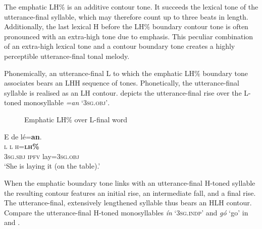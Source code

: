 The emphatic LH\% is an additive contour tone. It succeeds the  lexical tone of the utterance-final syllable, which may therefore count up to three beats in length. Additionally, the last lexical H before the LH\% boundary contour tone is often pronounced with an extra-high tone due to emphasis. This peculiar combination of an extra-high lexical tone and a contour boundary tone creates a highly perceptible utterance-final tonal melody. 



Phonemically, an utterance-final L to which the emphatic LH\% boundary tone associates bears an LHH sequence of tones. Phonetically, the utterance-final syllable is realised as an LH contour.  depicts the utterance-final rise over the L-toned monosyllable \textit{=an} ‘\textsc{3sg.obj’}. 


\begin{figure}
\caption{Emphatic LH\% over L-final word}
\label{fig:key:3.30}
\end{figure}


\ea%
    \label{ex:key:83}
    \glll   E    de  lé=\textbf{an}.\\
\textsc{l}    \textsc{l}  \textsc{h=}\textbf{\textsc{lh\%}}\\
\textsc{3sg.sbj}  \textsc{ipfv}    lay=\textsc{3sg.obj}\\
\glt ‘She is laying it (on the table).’
\z

When the emphatic boundary tone links with an utterance-final H-toned syllable the resulting contour features an initial rise, an intermediate fall, and a final rise. The utterance-final, extensively lengthened syllable thus bears an HLH contour. Compare the utterance-final H-toned monosyllables \textit{ín} ‘\textsc{3sg.indp}’ and \textit{gó} ‘go’ in  and .

